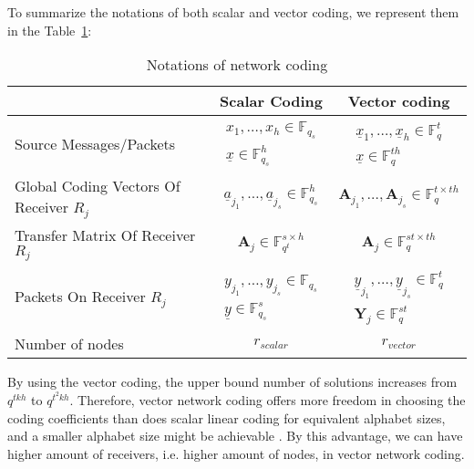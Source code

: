 To summarize the notations of both scalar and vector coding, we represent
them in the Table~\ref{tab:notations}:

\begin{table}[H]
\caption{Notations of network coding}

\label{tab:notations} 

\begin{tabular}{|>{\centering}p{0.2\paperwidth}|c|c|}
\hline 
 & Scalar Coding & Vector coding\tabularnewline
\hline 
\hline 
Source Messages/Packets & $\begin{array}{c}
x_{1},\ldots,x_{h}\in\ensuremath{\mathbb{F}}_{q_{s}}\\
\underline{x}\in\ensuremath{\mathbb{F}}_{q_{s}}^{h}
\end{array}$ & $\begin{array}{c}
\underline{x}_{1},\ldots,\underline{x}_{h}\in\ensuremath{\mathbb{F}}_{q}^{t}\\
\underline{x}\in\ensuremath{\mathbb{F}}_{q}^{th}
\end{array}$\tabularnewline
\hline 
Global Coding Vectors Of Receiver $R_{j}$ & $\underline{a}_{j_{1}},\ldots,\underline{a}_{j_{s}}\in\ensuremath{\mathbb{F}}_{q_{s}}^{h}$ & $\boldsymbol{A}_{j_{1}},\ldots,\boldsymbol{A}_{j_{s}}\in\ensuremath{\mathbb{F}}_{q}^{t\times th}$\tabularnewline
\hline 
Transfer Matrix Of Receiver $R_{j}$ & $\boldsymbol{A}_{j}\in\ensuremath{\mathbb{F}}_{q^{t}}^{s\times h}$ & $\boldsymbol{A}_{j}\in\ensuremath{\mathbb{F}}_{q}^{st\times th}$\tabularnewline
\hline 
Packets On Receiver $R_{j}$ & $\begin{array}{c}
y_{j_{1}},\ldots,y_{j_{s}}\in\ensuremath{\mathbb{F}}_{q_{s}}\\
\underline{y}\in\ensuremath{\mathbb{F}}_{q_{s}}^{s}
\end{array}$ & $\begin{array}{c}
\underline{y}_{j_{1}},\ldots,\underline{y}_{j_{s}}\in\ensuremath{\mathbb{F}}_{q}^{t}\\
\boldsymbol{Y}_{j}\in\ensuremath{\mathbb{F}}_{q}^{st}
\end{array}$\tabularnewline
\hline 
Number of nodes & $r_{scalar}$ & $r_{vector}$\tabularnewline
\hline 
\end{tabular}
\end{table}

\begin{rem}
By using the vector coding, the upper bound number of solutions increases
from $q^{tkh}$ to $q^{t^{2}kh}$. Therefore, vector network coding
offers more freedom in choosing the coding coefficients than does
scalar linear coding for equivalent alphabet sizes, and a smaller
alphabet size might be achievable \cite{Ebrahimi2011}. By this advantage,
we can have higher amount of receivers, i.e. higher amount of nodes,
in vector network coding.
\end{rem}

